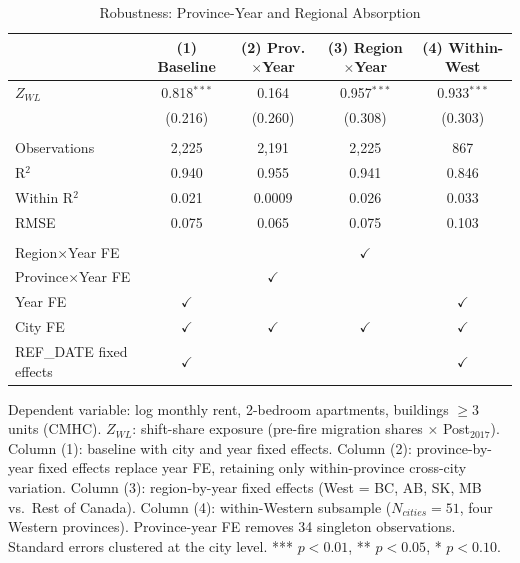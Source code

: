 \begin{table}[htbp]
   \caption{\label{tab:prov_year} Robustness: Province-Year and Regional Absorption}
   \bigskip
   \centering
   \begin{tabular}{lcccc}
      \toprule
                               & (1) Baseline & (2) Prov.$\times$Year & (3) Region$\times$Year & (4) Within-West \\  
      \midrule 
      $Z_{WL}$                 & 0.818$^{***}$ & 0.164         & 0.957$^{***}$ & 0.933$^{***}$\\   
                               & (0.216)       & (0.260)       & (0.308)       & (0.303)\\   
       \\
      Observations             & 2,225         & 2,191         & 2,225         & 867\\  
      R$^{2}$                  & 0.940         & 0.955         & 0.941         & 0.846\\  
      Within R$^{2}$           & 0.021         & 0.0009        & 0.026         & 0.033\\  
      RMSE                     & 0.075         & 0.065         & 0.075         & 0.103\\  
       \\
      Region×Year FE           &               &               & $\checkmark$  & \\  
      Province×Year FE         &               & $\checkmark$  &               & \\  
Year FE & $\checkmark$ &  &  & $\checkmark$ \\
      City FE                  & $\checkmark$  & $\checkmark$  & $\checkmark$  & $\checkmark$\\   
      REF\_DATE fixed effects  & $\checkmark$  &               &               & $\checkmark$\\   
      \bottomrule
   \end{tabular}
   
   \par \raggedright 
   Dependent variable: log monthly rent, 2-bedroom apartments, buildings $\geq 3$ units (CMHC). $Z_{WL}$: shift-share exposure (pre-fire migration shares $\times$ Post$_{2017}$). Column (1): baseline with city and year fixed effects. Column (2): province-by-year fixed effects replace year FE, retaining only within-province cross-city variation. Column (3): region-by-year fixed effects (West = BC, AB, SK, MB vs.~Rest of Canada). Column (4): within-Western subsample ($N_{cities}=51$, four Western provinces). Province-year FE removes 34 singleton observations. Standard errors clustered at the city level. *** $p<0.01$, ** $p<0.05$, * $p<0.10$.
\end{table}
